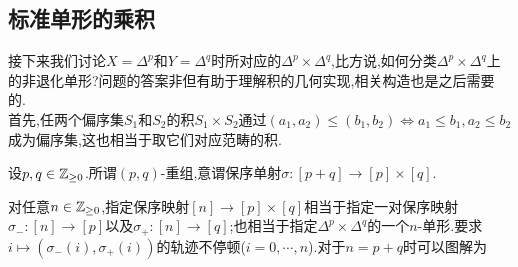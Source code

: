 \subsection{标准单形的乘积}
接下来我们讨论$X = \Delta^p$和$Y = \Delta^q$时所对应的$\Delta^p \times \Delta^q$,比方说,如何分类$\Delta^p \times \Delta^q$上的非退化单形?问题的答案非但有助于理解积的几何实现,相关构造也是之后需要的.\\
首先,任两个偏序集$S_1$和$S_2$的积$S_1 \times S_2$通过$(a_1,a_2) \leq (b_1,b_2) \Leftrightarrow a_1 \leq b_1,a_2 \leq b_2$成为偏序集,这也相当于取它们对应范畴的积.
\begin{definition}
    设$p,q\in \mathbb{Z}_{\geq 0}$.所谓$(p,q)$-重组,意谓保序单射$\sigma : [p+q]\to [p]\times [q]$.
\end{definition}
对任意$n\in \mathbb{Z}_{\geq 0}$,指定保序映射$[n] \to [p]\times [q]$相当于指定一对保序映射$\sigma_{-} : [n] \to [p]$以及$\sigma_{+}:[n] \to [q]$;也相当于指定$\Delta^p \times \Delta^q$的一个$n$-单形.要求$i \mapsto (\sigma_{-}(i),\sigma_{+}(i))$的轨迹不停顿($i = 0,\cdots,n$).对于$n = p+q$时可以图解为
